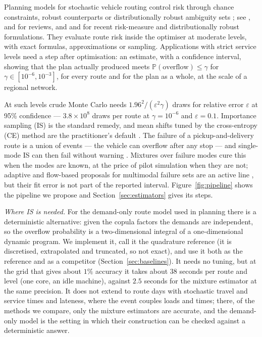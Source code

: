 \documentclass[ijoc,sglanonrev]{informs4}
\renewcommand{\P}{\mathbb{P}}
\begin{document}
Planning models for stochastic vehicle routing control risk through chance
constraints, robust counterparts or distributionally robust ambiguity sets
\citep{GounarisWiesemannFloudas2013,DinhFukasawaLuedtke2018,GhosalWiesemann2020};
see \citet{GendreauJabaliRei2016}, \citet{akhmetbek2024stochastic} and \citet{karimi2026stochastic} for reviews,
and \citet{Ghosal2024Unifying} and \citet{wang2023distributionally,yin2022distributionally} for recent
risk-measure and distributionally robust formulations. They evaluate route risk inside
the optimiser at moderate levels, with exact formulas, approximations or
sampling. Applications with strict service levels need a step after
optimisation: an estimate, with a confidence interval, showing that the plan
actually produced meets $\P(\text{overflow}) \le \gamma$ for
$\gamma \in [10^{-6}, 10^{-3}]$, for every route and for the plan as a whole,
at the scale of a regional network.

At such levels crude Monte Carlo needs $1.96^2/(\varepsilon^2\gamma)$ draws for
relative error $\varepsilon$ at 95\% confidence --- $3.8\times10^{8}$ draws per
route at $\gamma=10^{-6}$ and $\varepsilon=0.1$. Importance sampling (IS) is the
standard remedy, and mean shifts tuned by the cross-entropy (CE) method are
the practitioner's default \citep{deBoerEtAl2005}. The failure of a
pickup-and-delivery route is a union of events --- the vehicle can overflow
after any stop --- and single-mode IS can then fail without warning
\citep{GlassermanWang1997}. Mixtures over failure modes
\citep{OwenMaximovChertkov2019,KurtzSong2013,GeyerPapaioannouStraub2019} cure
this when the modes are known, at the price of pilot simulation when they are
not; adaptive and flow-based proposals for multimodal failure sets are an
active line \citep{Helal2026Multimodal,Zhang2026GMM}, but
their fit error is not part of the reported interval. Figure~\ref{fig:pipeline}
shows the pipeline we propose and Section~\ref{sec:estimators} gives its steps.

\emph{Where IS is needed.} For the demand-only route model used in planning
there is a deterministic alternative: given the copula factors the demands are
independent, so the overflow probability is a two-dimensional integral of a
one-dimensional dynamic program. We implement it, call it the quadrature
reference (it is discretised, extrapolated and truncated, so not exact), and
use it both as the reference and as a competitor
(Section~\ref{sec:baselines}). It needs no tuning, but at the grid that gives
about $1\%$ accuracy it takes about $38$ seconds per route and level (one core, an idle machine),
against $2.5$ seconds for the mixture estimator at the same precision. It does
not extend to route days with stochastic travel and service times and
lateness, where the event couples loads and times; there, of the methods we
compare, only the mixture estimators are accurate, and the demand-only model
is the setting in which their construction can be checked against a
deterministic answer.
\end{document}
